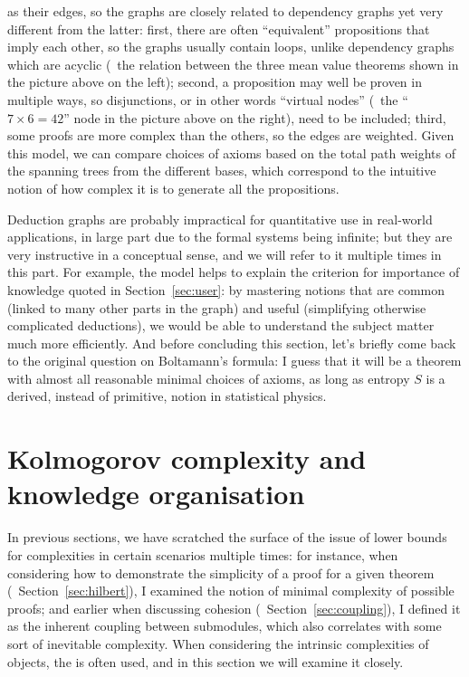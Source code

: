 as their edges, so the graphs are closely related to dependency graphs yet very
different from the latter: first, there are often ``equivalent'' propositions
that imply each other, so the graphs usually contain loops, unlike dependency
graphs which are acyclic (\cf~the relation between the three mean value theorems
shown in the picture above on the left); second, a proposition may well be
proven in multiple ways, so disjunctions, or in other words ``virtual nodes''
(\eg~the ``$7 \times 6 = 42$'' node in the picture above on the right),
need to be included; third, some proofs are more complex than the others,
so the edges are weighted.  Given this model, we can compare choices
of axioms based on the total path weights of the spanning trees from
the different bases, which correspond to the intuitive notion of
how complex it is to generate all the propositions.

Deduction graphs are probably impractical for quantitative use in real-world
applications, in large part due to the formal systems being infinite; but they
are very instructive in a conceptual sense, and we will refer to it multiple
times in this part.  For example, the model helps to explain the criterion
for importance of knowledge quoted in Section~\ref{sec:user}: by mastering
notions that are common (linked to many other parts in the graph) and useful
(simplifying otherwise complicated deductions), we would be able to
understand the subject matter much more efficiently.  And before concluding
this section, let's briefly come back to the original question on Boltamann's
formula: I guess that it will be a theorem with almost all reasonable
minimal choices of axioms, as long as entropy $S$ is a derived,
instead of primitive, notion in statistical physics.

\section{Kolmogorov complexity and knowledge organisation}\label{sec:kolmogorov}

In previous sections, we have scratched the surface of the issue of lower
bounds for complexities in certain scenarios multiple times: for instance,
when considering how to demonstrate the simplicity of a proof for a given
theorem (\cf~Section~\ref{sec:hilbert}), I examined the notion of minimal
complexity of possible proofs; and earlier when discussing cohesion
(\cf~Section~\ref{sec:coupling}), I defined it as the inherent coupling
between submodules, which also correlates with some sort of inevitable
complexity.  When considering the intrinsic complexities of objects,
the  is
often used, and in this section we will examine it closely.

